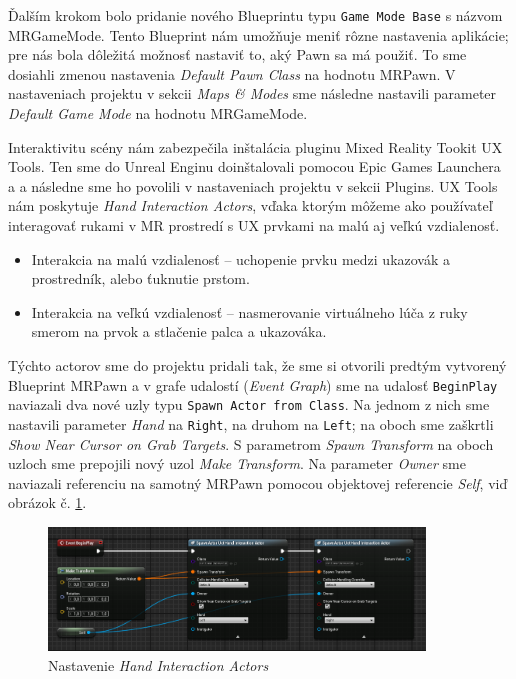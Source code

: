 Ďalším krokom bolo pridanie nového Blueprintu typu \texttt{Game Mode Base} s názvom MRGameMode. Tento Blueprint nám umožňuje meniť rôzne nastavenia aplikácie; pre nás bola dôležitá možnosť nastaviť 
to, aký Pawn sa má použiť. To sme dosiahli zmenou nastavenia \emph{Default Pawn Class} na hodnotu MRPawn. V nastaveniach projektu v sekcii \emph{Maps \& Modes} sme následne nastavili parameter
\emph{Default Game Mode} na hodnotu MRGameMode.

Interaktivitu scény nám zabezpečila inštalácia pluginu Mixed Reality Tookit UX Tools. Ten sme do Unreal Enginu doinštalovali pomocou Epic Games Launchera a a následne sme ho povolili v nastaveniach
projektu v sekcii Plugins. UX Tools nám poskytuje \emph{Hand Interaction Actors}, vďaka ktorým môžeme ako používateľ interagovať rukami v MR prostredí s UX prvkami na malú aj veľkú vzdialenosť.
\begin{itemize}
  \item Interakcia na malú vzdialenosť {--} uchopenie prvku medzi ukazovák a prostredník, alebo ťuknutie prstom.
  \item Interakcia na veľkú vzdialenosť {--} nasmerovanie virtuálneho lúča z ruky smerom na prvok a stlačenie palca a ukazováka.
\end{itemize}
Týchto actorov sme do projektu pridali tak, že sme si otvorili predtým vytvorený Blueprint MRPawn a v grafe udalostí (\emph{Event Graph}) sme na udalosť \texttt{BeginPlay} naviazali dva nové uzly
typu \texttt{Spawn Actor from Class}. Na jednom z nich sme nastavili parameter \emph{Hand} na \texttt{Right}, na druhom na \texttt{Left}; na oboch sme zaškrtli \emph{Show Near Cursor on Grab Targets}.
S parametrom \emph{Spawn Transform} na oboch uzloch sme prepojili nový uzol \emph{Make Transform}. Na parameter \emph{Owner} sme naviazali referenciu na samotný MRPawn pomocou objektovej referencie
\emph{Self}, viď obrázok č. \ref{spawn-actor}.

\begin{figure}[!htbp]
  \centering
  \includegraphics[width=10cm]{img/spawn-actor.png}
  \caption{Nastavenie \emph{Hand Interaction Actors}}
  \label{spawn-actor}
\end{figure}

